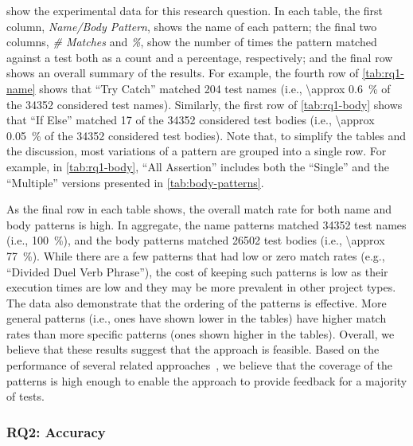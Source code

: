 \documentclass[proposal.tex]{subfiles}
\begin{document}
 show the experimental data for this research question.
% 
In each table, the first column, \emph{Name\slash Body Pattern}, shows the name of each pattern; the final two columns, \emph{\# Matches} and \emph{\%}, show the number of times the pattern matched against a test both as a count and a percentage, respectively; and the final row shows an overall summary of the results.
%
For example, the fourth row of \cref{tab:rq1-name} shows that \enquote{Try Catch} matched \num{204} test names (i.e., \SI{\approx 0.6}{\percent} of the \num{34352} considered test names).
%
Similarly, the first row of \cref{tab:rq1-body} shows that \enquote{If Else} matched \num{17} of the \num{34352} considered test bodies (i.e., \SI{\approx 0.05}{\percent} of the \num{34352} considered test bodies).
% 
Note that, to simplify the tables and the discussion, most variations of a pattern are grouped into a single row.  For example, in \cref{tab:rq1-body}, \enquote{All Assertion} includes both the \enquote{Single} and the \enquote{Multiple} versions presented in \cref{tab:body-patterns}.


As the final row in each table shows, the overall match rate for both name and body patterns is high.
%
In aggregate, the name patterns matched \num{34352} test names (i.e., \SI{100}{\percent}), and the body patterns matched \num{26502} test bodies (i.e., \SI{\approx 77}{\percent}).
%
While there are a few patterns that had low or zero match rates (e.g., \enquote{Divided Duel Verb Phrase}), the cost of keeping such patterns is low as their execution times are low and they may be more prevalent in other project types.
%
The data also demonstrate that the ordering of the patterns is effective.
%
More general patterns (i.e., ones have shown lower in the tables) have higher match rates than more specific patterns (ones shown higher in the tables).
%
Overall, we believe that these results suggest that the approach is feasible.
Based on the performance of several related approaches~\cite{host2009debugging,host2008java,zhong2013detecting,singer2008exploiting,allamanis2014learning}, we believe that the coverage of the patterns is high enough to enable the approach to provide feedback for a majority of tests.


\subsubsection{RQ2: Accuracy}
\label{sec:evaluation:accuracy}
\end{document}
